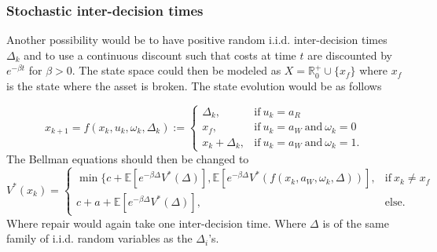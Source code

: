 \subsubsection{Stochastic inter-decision times}
Another possibility would be to have positive random i.i.d. inter-decision times $\Delta_k$ and to use a continuous discount such that costs at time $t$ are discounted by $e^{-\beta t}$ for $\beta>0$.
The state space could then be modeled as $X=\mathbb{R}_0^+\cup\{x_f\}$ where $x_f$ is the state where the asset is broken.
The state evolution would be as follows

$$
x_{k+1}=f(x_k,u_k,\omega_k,\Delta_k):=\begin{cases}
\Delta_k,&\text{if}\ u_k=a_R \\
x_f,&\text{if}\ u_k=a_W\ \text{and}\ \omega_k=0 \\
x_k+\Delta_k,&\text{if}\ u_k=a_W\ \text{and}\ \omega_k=1.
\end{cases}
$$
The Bellman equations should then be changed to
$$
V^*(x_k)=\begin{cases}
\min\{c+\mathbb{E}[e^{-\beta \Delta} V^*(\Delta)],\mathbb{E}[e^{-\beta \Delta} V^*(f(x_k,a_W,\omega_k,\Delta))],&\text{if}\ x_k\neq x_f \\
c+a+\mathbb{E}[e^{-\beta \Delta} V^*(\Delta)],&\text{else.}
\end{cases}
$$
Where repair would again take one inter-decision time. Where $\Delta$ is of the same family of i.i.d. random variables as the $\Delta_i$'s.

